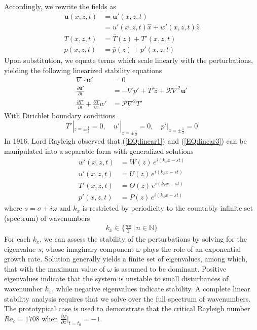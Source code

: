 \documentclass[reprint,amsmath,amssymb,aps]{revtex4-1}
\begin{document}
Accordingly, we rewrite the fields as
\begin{align}
    \mathbf{u}(x, z, t) &= \mathbf{u'}(x, z, t) \label{EQ:reynolds_dc_u}\\
    &= u'(x, z, t)\hat{x} + w'(x, z, t)\hat{z} \\
    T(x, z, t) &= \bar{T}(z) + T'(x, z, t) \label{EQ:reynolds_dc_T}\\
    p(x, z, t) &= \bar{p}(z) + p'(x, z, t)
\end{align}
Upon substitution, we equate terms which scale linearly with the perturbations, yielding the following linearized stability equations
\begin{align}
    \nabla \cdot \mathbf{u'} &= 0 \label{EQ:linear1}\\
    \frac{\partial\mathbf{u'}}{\partial t} &= - \nabla p' + T'\hat{z} + \mathcal{R} \nabla^2 \mathbf{u'} \label{EQ:linear2}\\
    \frac{\partial T'}{\partial t} + \frac{\partial \bar{T}}{\partial z} w' &= \mathcal{P} \nabla^2 T'\label{EQ:linear3}
\end{align}
With Dirichlet boundary conditions 
\begin{equation}
    T'|_{z = \pm \frac{1}{2}} = 0, \quad u'|_{z = \pm \frac{1}{2}} = 0, \quad p'|_{z = \pm \frac{1}{2}} = 0
\end{equation}
In 1916, Lord Rayleigh observed that (\ref{EQ:linear1}) and (\ref{EQ:linear3}) can be manipulated into a separable form with generalized solutions
\begin{align}
    w'(x, z, t) &= W(z) \, e^{i(k_xx-st)} \label{EQ:normal_modes1}\\ 
    u'(x, z, t) &= U(z) \, e^{i(k_xx-st)} \label{EQ:normal_modes2}\\ 
    T'(x, z, t) &= \Theta(z) \, e^{i(k_xx-st)} \label{EQ:normal_modes3}\\ 
    p'(x, z, t) &= P(z) \, e^{i(k_xx-st)}\label{EQ:normal_modes4}
\end{align}
where $s = \sigma + i\omega$ and $k_x$ is restricted by periodicity to the countably infinite set (spectrum) of wavenumbers
\begin{align}
    k_x \in \big\{\frac{n\pi}{2} \, \big| \, n \in \mathbb{N}\big\}
\end{align}
For each $k_x$, we can assess the stability of the perturbations by solving for the eigenvalue $s$, whose imaginary component $\omega$ plays the role of an exponential growth rate. Solution generally yields a finite set of eigenvalues, among which, that with the maximum value of $\omega$ is assumed to be dominant. Positive eigenvalues indicate that the system is unstable to small disturbances of wavenumber $k_x$, while negative eigenvalues indicate stability. A complete linear stability analysis requires that we solve over the full spectrum of wavenumbers. The prototypical case is used to demonstrate that the critical Rayleigh number $Ra_c = 1708$ when $\frac{\partial \bar{T}}{\partial z}\big|_{t=t_0} = -1$.
\end{document}
